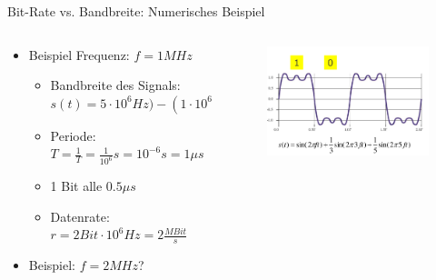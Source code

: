 \documentclass[xcolor=dvipsnames,aspectratio=169]{beamer}
\begin{document}
\begin{frame}{Bit-Rate vs. Bandbreite: Numerisches Beispiel}
\begin{columns}[T] %
\begin{column}{.6\textwidth}
\vspace*{-.7cm}
\begin{itemize}
	\item Beispiel Frequenz: $f = 1 MHz$
	\begin{itemize}
		\item Bandbreite des Signals: $s(t) = 5 \cdot 10^6 Hz) - (1 \cdot 10^6 Hz) = 4 MHz$
		\item Periode: $T = \frac{1}{T} = \frac{1}{10^6}s = 10^{-6}s = 1 \mu s$
		\item 1 Bit alle $0.5 \mu s$
		\item Datenrate: $r = 2 Bit \cdot 10^6 Hz = 2 \frac{MBit}{s}$
	\end{itemize}
	\item Beispiel: $f = 2 MHz$?
\end{itemize}
\end{column}%
\hfill%
\begin{column}{.4\textwidth}
\vspace*{-.7cm}
\begin{figure}
\centering
\includegraphics[scale=0.25]{bsp2}
\end{figure}
\end{column}%
\end{columns}
\end{frame}
\end{document}
